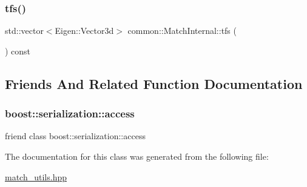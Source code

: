 \subsubsection{\texorpdfstring{tfs()}{tfs()}}
{\footnotesize\ttfamily std\+::vector$<$Eigen\+::\+Vector3d$>$ common\+::\+Match\+Internal\+::tfs (\begin{DoxyParamCaption}{ }\end{DoxyParamCaption}) const\hspace{0.3cm}{\ttfamily [inline]}}



\subsection{Friends And Related Function Documentation}
\mbox{\label{classcommon_1_1MatchInternal_ac98d07dd8f7b70e16ccb9a01abf56b9c}} 
\subsubsection{\texorpdfstring{boost\+::serialization\+::access}{boost::serialization::access}}
{\footnotesize\ttfamily friend class boost\+::serialization\+::access\hspace{0.3cm}{\ttfamily [friend]}}



The documentation for this class was generated from the following file\+:\begin{DoxyCompactItemize}
\item 
\hyperlink{match__utils_8hpp}{match\+\_\+utils.\+hpp}\end{DoxyCompactItemize}
